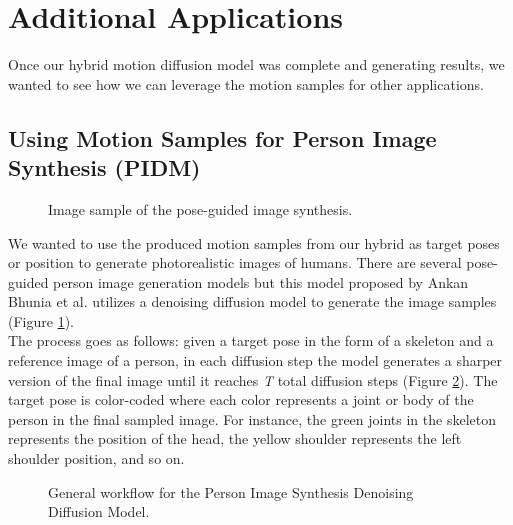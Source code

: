 \documentclass[10pt,twocolumn,letterpaper]{article}
\begin{document}
\section{Additional Applications}
\label{sec:additional-applications}

Once our hybrid motion diffusion model was complete and generating results, we wanted to see how we can
leverage the motion samples for other applications. 

\subsection{Using Motion Samples for Person Image Synthesis (PIDM)}

\begin{figure}[H]
    \centering

    \caption{Image sample of the pose-guided image synthesis.}
    \label{fig:pidm-0}
\end{figure}


We wanted to use the produced motion samples from our hybrid as target poses or position to generate 
photorealistic images of humans. There are several pose-guided person image generation
models but this model proposed by Ankan Bhunia et al. \cite{Bhunia23} utilizes a denoising diffusion model to
generate the image samples (Figure \ref{fig:pidm-0}).
\\

The process goes as follows: given a target pose in the form of a skeleton and a reference image 
of a person, in each diffusion step the model generates a sharper version of the final image until it
reaches \emph{T} total diffusion steps (Figure \ref{fig:pidm-1}). The target pose is color-coded where
each color represents a joint or body of the person in the final sampled image. For instance, the green 
joints in the skeleton represents the position of the head, the yellow shoulder represents the left shoulder 
position, and so on.

\begin{figure}[H]
    \centering

    \caption{General workflow for the Person Image Synthesis Denoising Diffusion Model.}
    \label{fig:pidm-1}
\end{figure}
\end{document}
